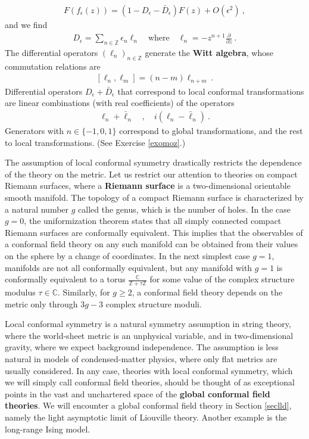 \documentclass[12pt, a4paper, notitlepage, twoside]{report}
\numberwithin{equation}{section}
\theoremstyle{break}
\begin{document}
\begin{align}
 F(f_\epsilon(z)) = \left(1- D_\epsilon -\bar{D}_\epsilon \right)F(z) + O(\epsilon^2)\ ,
\label{ffe}
\end{align}
and we find
\begin{align}
 D_\epsilon = \sum_{n\in {\mathbb{Z}}} \epsilon_n\ell_n  \quad \text{where} \quad \boxed{\ell_n= -z^{n+1}{\frac{\partial}{\partial z}}} \ .
\label{elln}
\end{align}
The differential operators $(\ell_n)_{n\in {\mathbb{Z}}}$ generate the \textbf{\boldmath Witt algebra}, whose commutation relations are
\begin{align}
 \boxed{[\ell_n,\ell_m]=(n-m)\ell_{n+m}}\ .
\end{align}
Differential operators $D_\epsilon +\bar{D}_\epsilon$ that correspond to local conformal transformations are linear combinations (with real coefficients) of the operators
\begin{align}
 \ell_n + \bar\ell_n \quad , \quad i(\ell_n-\bar\ell_n) \ .
 \label{ilml}
\end{align}
Generators with $n\in\{-1,0,1\}$ correspond to global transformations, and the rest to local transformations. (See Exercise \ref{exomoz}.) 

The assumption of local conformal symmetry drastically restricts the dependence of the theory on the metric.
Let us restrict our attention to theories on compact Riemann surfaces, where a \textbf{\boldmath Riemann surface} is a two-dimensional orientable smooth manifold.
The topology of a compact Riemann surface is characterized by a natural number $g$ called the genus, which is the number of holes.
In the case $g=0$, the uniformization theorem states that all simply connected compact Riemann surfaces are conformally equivalent. 
This implies that the observables of a conformal field theory on any such manifold can be obtained from their values on the sphere by a change of coordinates.
In the next simplest case $g=1$, manifolds are not all conformally equivalent, but any manifold with $g=1$ is conformally equivalent to a torus $\frac{{\mathbb{C}}}{{\mathbb{Z}}+\tau{\mathbb{Z}}}$ for some value of the
complex structure modulus $\tau \in {\mathbb{C}}$.
Similarly, for $g\geq 2$, a conformal field theory depends on the metric only through $3g-3$ complex structure moduli. 

Local conformal symmetry is a natural symmetry assumption in string theory, where the world-sheet metric is an unphysical variable, and in two-dimensional gravity, where we expect background independence.
The assumption is less natural in models of condensed-matter physics, where only flat metrics are usually considered.
In any case, theories with local conformal symmetry, which we will simply call conformal field theories, should be thought of as exceptional points in the vast and unchartered space of the \textbf{\boldmath global conformal field theories}.
We will encounter a global conformal field theory in Section \ref{seclld}, namely the light asymptotic limit of Liouville theory.
Another example is the long-range Ising model. 
\end{document}
